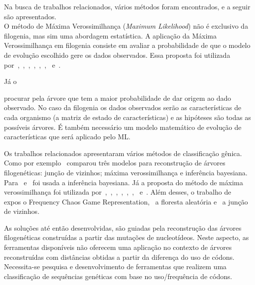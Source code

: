 Na busca de trabalhos relacionados, vários métodos foram encontrados, e a seguir são apresentados.\\
O método de Máxima Verossimilhança (\textit{Maximum Likelihood}) não é exclusivo da filogenia, mas sim uma abordagem estatística. A aplicação da Máxima Verossimilhança em filogenia consiste em avaliar a probabilidade de que o modelo de evolução escolhido gere os dados observados. Essa proposta foi utilizada por~\cite{fall_genetic_diversity_2021},~\cite{behl_threat_2022},~\cite{shabbir_comprehensive_2020},~\cite{hudu_hepatitis_2018},~\cite{sallard_tracing_2021},~\cite{paez-espino_diversity_evolution_2019},~\cite{tang_evolutionary_2021} e~\cite{cho_analysis_2022}.

Já o

procurar pela árvore que tem a maior probabilidade de dar origem ao dado observado. No caso da filogenia os dados observados serão as características de cada organismo (a matriz de estado de características) e as hipóteses são todas as possíveis árvores. É também necessário um modelo matemático de evolução de características que será aplicado pelo ML.

Os trabalhos relacionados apresentaram vários métodos de classificação gênica. Como por exemplo~\cite{dimitrov_updated_2019} comparou três modelos para reconstrução de árvores filogenéticas: junção de vizinhos; máxima verossimilhança e inferência bayesiana. Para~\cite{yin_systematic_2019} e~\cite{bedoya-pilozo_molecular_epidemiology_2018} foi usada a inferência bayesiana. Já a proposta do método de máxima verossimilhança foi utilizada por~\cite{fall_genetic_diversity_2021},~\cite{behl_threat_2022},~\cite{shabbir_comprehensive_2020},~\cite{hudu_hepatitis_2018},~\cite{sallard_tracing_2021},~\cite{paez-espino_diversity_evolution_2019},~\cite{tang_evolutionary_2021} e~\cite{cho_analysis_2022}. Além desses, o trabalho de~\cite{lichtblau_alignment-free_2019} expos o Frequency Chaos Game Representation,~\cite{kim_ngs_2022} a floresta aleatória e~\cite{potdar_phylogenetic_2021} a junção de vizinhos.

As soluções até então desenvolvidas, são guiadas pela reconstrução das árvores filogenéticas construídas a partir das mutações de nucleotídeos. Neste aspecto, as ferramentas disponíveis não oferecem uma aplicação no contexto de árvores reconstruídas com distâncias obtidas a partir da diferença do uso de códons. Necessita-se pesquisa e desenvolvimento de ferramentas que realizem uma classificação de sequências genéticas com base no uso/frequência de códons.

